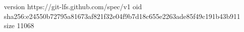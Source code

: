 version https://git-lfs.github.com/spec/v1
oid sha256:e24550b72795a81673af821f32e04f9b7d18c655e2263ade85f49c191b43b911
size 11068
